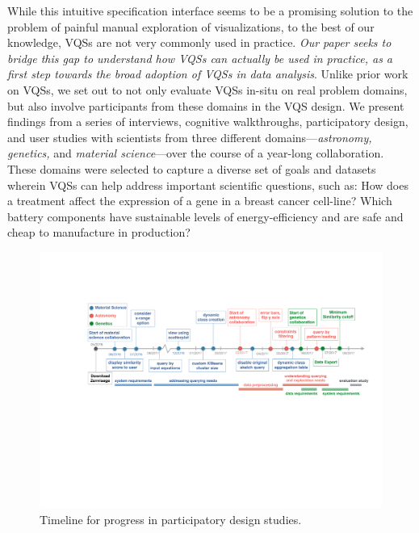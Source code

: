 \par
While this intuitive
specification interface
seems to be a promising solution
to the problem of painful manual exploration of visualizations,
to the best of our knowledge, VQSs are not very commonly used in practice.
{\em Our paper seeks to bridge this gap
to understand how VQSs can actually be used in practice,
as a first step towards the broad adoption of VQSs in data analysis}.
Unlike prior work on VQSs,
we set out to not only evaluate VQSs in-situ on
real problem domains, but also involve participants
from these domains in the VQS design.
We present findings from a series of interviews,
cognitive walkthroughs, participatory design,
and user studies with scientists from three different domains---{\em astronomy, genetics,} and {\em material science}---over the course of
a year-long collaboration.
These domains were selected to capture
a diverse set of goals
and datasets wherein VQSs can help address
important scientific questions, such as:
How does a treatment affect the expression
of a gene in a breast cancer cell-line?
Which battery components have sustainable
levels of energy-efficiency and are safe and
cheap to manufacture in production?
\begin{figure}[ht!]
	\centering
	\captionsetup{justification=centering,margin=2cm}
	\vspace{-10pt}
	\includegraphics[width=6in]{figures/timeline_anon.pdf}
	\vspace{-6pt}\caption{Timeline for progress in participatory design studies.}
	\label{timeline}
	\vspace{-10pt}
\end{figure}

